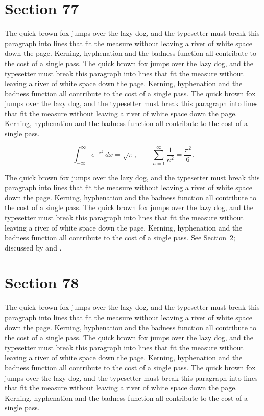 \documentclass{article}
\begin{document}
\section{Section 77}
\label{sec:77}
The quick brown fox jumps over the lazy dog, and the typesetter must break this paragraph into lines that fit the measure without leaving a river of white space down the page. Kerning, hyphenation and the badness function all contribute to the cost of a single pass. The quick brown fox jumps over the lazy dog, and the typesetter must break this paragraph into lines that fit the measure without leaving a river of white space down the page. Kerning, hyphenation and the badness function all contribute to the cost of a single pass. The quick brown fox jumps over the lazy dog, and the typesetter must break this paragraph into lines that fit the measure without leaving a river of white space down the page. Kerning, hyphenation and the badness function all contribute to the cost of a single pass. 

\begin{equation}\label{eq:77}
\int_{-\infty}^{\infty} e^{-x^{2}}\,dx = \sqrt{\pi}, \qquad
\sum_{n=1}^{\infty} \frac{1}{n^{2}} = \frac{\pi^{2}}{6}.
\end{equation}

The quick brown fox jumps over the lazy dog, and the typesetter must break this paragraph into lines that fit the measure without leaving a river of white space down the page. Kerning, hyphenation and the badness function all contribute to the cost of a single pass. The quick brown fox jumps over the lazy dog, and the typesetter must break this paragraph into lines that fit the measure without leaving a river of white space down the page. Kerning, hyphenation and the badness function all contribute to the cost of a single pass. 
See Section~\ref{sec:78}; discussed by \textcite{k3} and \textcite{l5}.
\section{Section 78}
\label{sec:78}
The quick brown fox jumps over the lazy dog, and the typesetter must break this paragraph into lines that fit the measure without leaving a river of white space down the page. Kerning, hyphenation and the badness function all contribute to the cost of a single pass. The quick brown fox jumps over the lazy dog, and the typesetter must break this paragraph into lines that fit the measure without leaving a river of white space down the page. Kerning, hyphenation and the badness function all contribute to the cost of a single pass. The quick brown fox jumps over the lazy dog, and the typesetter must break this paragraph into lines that fit the measure without leaving a river of white space down the page. Kerning, hyphenation and the badness function all contribute to the cost of a single pass. 
\end{document}
